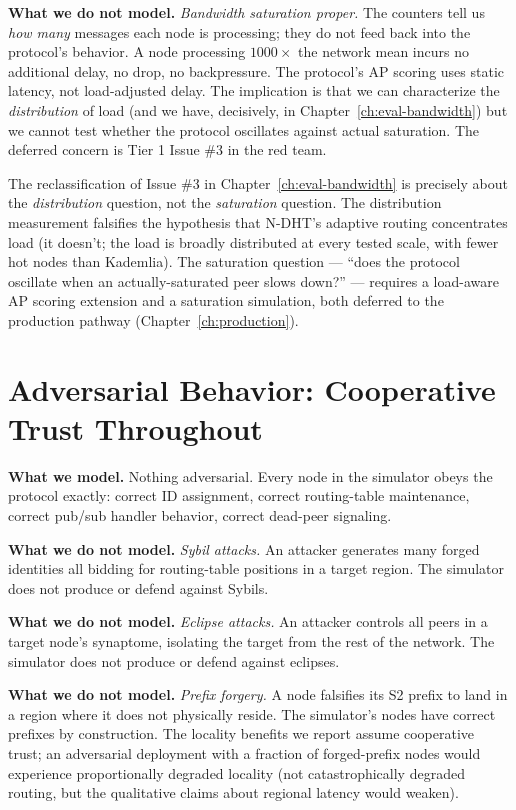 \documentclass[twoside,nobib]{tufte-book}
\newcommand{\NDHT}{N-DHT\xspace}
\begin{document}
\textbf{What we do not model.} \emph{Bandwidth saturation
proper.} The counters tell us \emph{how many} messages each node
is processing; they do not feed back into the protocol's
behavior. A node processing $1000\times$ the network mean
incurs no additional delay, no drop, no backpressure. The
protocol's AP scoring uses static latency, not load-adjusted
delay. The implication is that we can characterize the
\emph{distribution} of load (and we have, decisively, in
Chapter~\ref{ch:eval-bandwidth}) but we cannot test whether the
protocol oscillates against actual saturation. The deferred
concern is Tier 1 Issue \#3 in the red team.

The reclassification of Issue \#3 in Chapter~\ref{ch:eval-bandwidth}
is precisely about the \emph{distribution} question, not the
\emph{saturation} question. The distribution measurement
falsifies the hypothesis that \NDHT's adaptive routing
concentrates load (it doesn't; the load is broadly distributed
at every tested scale, with fewer hot nodes than Kademlia). The
saturation question --- ``does the protocol oscillate when an
actually-saturated peer slows down?'' --- requires a load-aware
AP scoring extension and a saturation simulation, both deferred
to the production pathway (Chapter~\ref{ch:production}).

\section{Adversarial Behavior: Cooperative Trust Throughout}

\textbf{What we model.} Nothing adversarial. Every node in the
simulator obeys the protocol exactly: correct ID assignment,
correct routing-table maintenance, correct pub/sub handler
behavior, correct dead-peer signaling.

\textbf{What we do not model.} \emph{Sybil attacks.} An attacker
generates many forged identities all bidding for routing-table
positions in a target region. The simulator does not produce or
defend against Sybils.

\textbf{What we do not model.} \emph{Eclipse attacks.} An
attacker controls all peers in a target node's synaptome,
isolating the target from the rest of the network. The simulator
does not produce or defend against eclipses.

\textbf{What we do not model.} \emph{Prefix forgery.} A node
falsifies its S2 prefix to land in a region where it does not
physically reside. The simulator's nodes have correct prefixes
by construction. The locality benefits we report assume
cooperative trust; an adversarial deployment with a fraction of
forged-prefix nodes would experience proportionally degraded
locality (not catastrophically degraded routing, but the
qualitative claims about regional latency would weaken).
\end{document}
